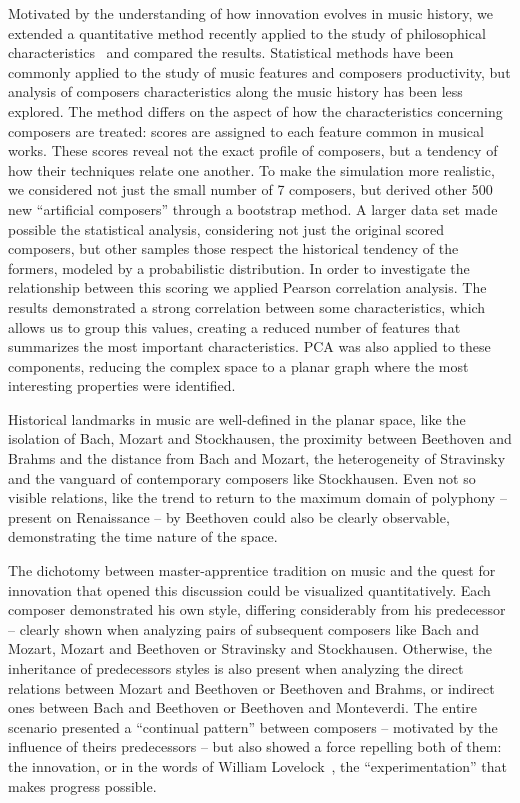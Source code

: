 \documentclass[
 aip,
 jmp,
 amsmath,amssymb,
 reprint,
]{revtex4-1}
\begin{document}
Motivated by the understanding of how innovation evolves in music
history, we extended a quantitative method
recently applied to the study of philosophical
characteristics~\cite{Fabbri} and compared the results. Statistical
methods have been commonly applied to the study of music features and
composers productivity, but analysis of
composers characteristics along the music history has been less
explored. The method differs on the
aspect of how the characteristics concerning composers are treated:
scores are assigned to each feature common in musical
works. These scores reveal not the
exact profile of composers, but a tendency of how their
techniques relate one another. To make the simulation more
realistic, we considered not just the small number of 7 composers, but
derived other 500 new ``artificial composers'' through a bootstrap
method. A larger data set made possible the statistical analysis,
considering not just the original scored composers, but other samples
those respect the historical tendency of the formers, modeled by a
probabilistic distribution.
In order to investigate the
relationship between this scoring we applied Pearson correlation
analysis. The results demonstrated a strong correlation between some
characteristics, which allows us to group this values, creating a
reduced number of features that summarizes the most important
characteristics. PCA was also applied to these components, reducing
the complex space to a planar graph where the most interesting
properties were identified. 

Historical landmarks in music are
well-defined in the planar space, like the isolation of Bach, Mozart
and Stockhausen, the
proximity between Beethoven and Brahms and the distance from Bach and Mozart, the heterogeneity of
Stravinsky and the vanguard of contemporary composers
like Stockhausen. Even not so visible relations, like the trend to return to the
maximum domain of polyphony -- present on Renaissance -- by Beethoven
could also be clearly observable, demonstrating the time nature of the
space. 

The dichotomy between
master-apprentice tradition on music and the quest for innovation that
opened this discussion could be visualized quantitatively. Each
composer demonstrated his own style, differing considerably from his
predecessor -- clearly shown when analyzing pairs of subsequent composers like
Bach and Mozart, Mozart and Beethoven or Stravinsky and
Stockhausen. Otherwise, the inheritance of predecessors styles is also
present when analyzing the direct relations between Mozart and
Beethoven or Beethoven and
Brahms, or indirect ones between Bach and Beethoven
or Beethoven and Monteverdi. The entire scenario presented
a ``continual pattern'' between
composers -- motivated by the influence of theirs predecessors -- but also showed a force
repelling both of them: the innovation, or in the words of William
Lovelock~\cite{Lovelock}, the ``experimentation'' that makes progress possible.
\end{document}
